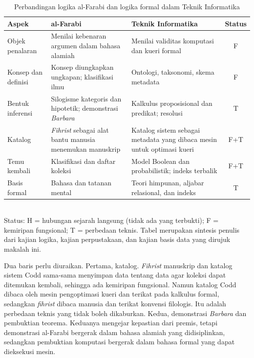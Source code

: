 \documentclass[12pt,a4paper]{article}
\begin{document}
\begin{table}[htbp]
\centering
\small
\caption{Perbandingan logika al-Farabi dan logika formal dalam Teknik Informatika}
\label{tab:banding}
\renewcommand{\arraystretch}{1.2}
\begin{tabularx}{\textwidth}{@{}>{\raggedright\arraybackslash}p{2.4cm}>{\raggedright\arraybackslash}X>{\raggedright\arraybackslash}Xc@{}}
\toprule
Aspek & al-Farabi & Teknik Informatika & Status\\
\midrule
Objek penalaran & Menilai kebenaran argumen dalam bahasa alamiah & Menilai validitas komputasi dan kueri formal & F\\
Konsep dan definisi & Konsep diungkapkan ungkapan; klasifikasi ilmu & Ontologi, taksonomi, skema metadata & F\\
Bentuk inferensi & Silogisme kategoris dan hipotetik; demonstrasi \emph{Barbara} & Kalkulus proposisional dan predikat; resolusi & T\\
Katalog & \emph{Fihrist} sebagai alat bantu manusia menemukan manuskrip & Katalog sistem sebagai metadata yang dibaca mesin untuk optimasi kueri & F+T\\
Temu kembali & Klasifikasi dan daftar koleksi & Model Boolean dan probabilistik; indeks terbalik & F+T\\
Basis formal & Bahasa dan tatanan mental & Teori himpunan, aljabar relasional, dan indeks & T\\
\bottomrule
\end{tabularx}
\\[4pt]
{\footnotesize Status: H = hubungan sejarah langsung (tidak ada yang terbukti);
F = kemiripan fungsional; T = perbedaan teknis. Tabel merupakan sintesis penulis dari kajian logika, kajian perpustakaan, dan kajian basis data yang dirujuk makalah ini.}
\end{table}

Dua baris perlu diuraikan. Pertama, katalog. \emph{Fihrist} manuskrip dan katalog sistem Codd sama-sama menyimpan data tentang data agar koleksi dapat ditemukan kembali, sehingga ada kemiripan fungsional. Namun katalog Codd dibaca oleh mesin pengoptimasi kueri dan terikat pada kalkulus formal, sedangkan \emph{fihrist} dibaca manusia dan terikat konvensi filologis. Itu adalah perbedaan teknis yang tidak boleh dikaburkan. Kedua, demonstrasi \emph{Barbara} dan pembuktian teorema. Keduanya mengejar kepastian dari premis, tetapi demonstrasi al-Farabi bergerak dalam bahasa alamiah yang didisiplinkan, sedangkan pembuktian komputasi bergerak dalam bahasa formal yang dapat dieksekusi mesin.
\end{document}

